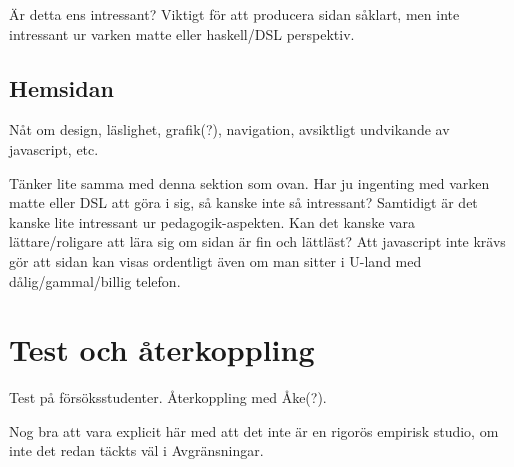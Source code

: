 \begin{binge}
Är detta ens intressant? Viktigt för att producera sidan såklart, men
inte intressant ur varken matte eller haskell/DSL perspektiv.

\subsection{Hemsidan}

Nåt om design, läslighet, grafik(?), navigation, avsiktligt undvikande
av javascript, etc.

Tänker lite samma med denna sektion som ovan. Har ju ingenting med
varken matte eller DSL att göra i sig, så kanske inte så intressant?
Samtidigt är det kanske lite intressant ur pedagogik-aspekten. Kan det
kanske vara lättare/roligare att lära sig om sidan är fin och
lättläst? Att javascript inte krävs gör att sidan kan visas ordentligt
även om man sitter i U-land med dålig/gammal/billig telefon.

\section{Test och återkoppling}


Test på försöksstudenter. Återkoppling med Åke(?).

Nog bra att vara explicit här med att det inte är en rigorös empirisk
studio, om inte det redan täckts väl i Avgränsningar.

\end{binge}
